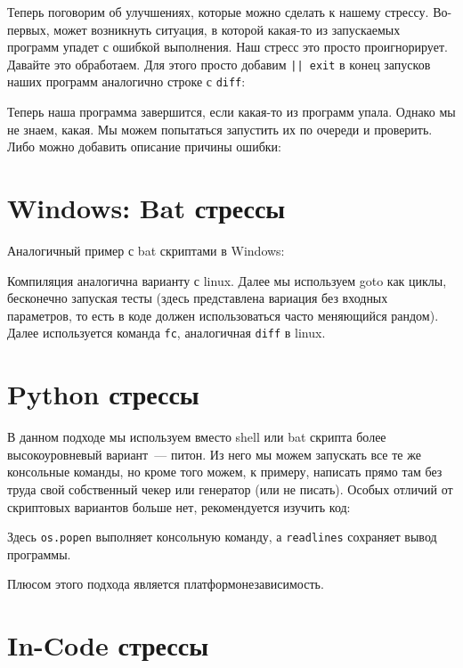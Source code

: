 Теперь поговорим об улучшениях, которые можно сделать к нашему стрессу. Во-первых, может возникнуть ситуация, в которой какая-то из запускаемых программ упадет с ошибкой выполнения. Наш стресс это просто проигнорирует. Давайте это обработаем. Для этого просто добавим \verb+|| exit+ в конец запусков наших программ аналогично строке с \verb+diff+:



Теперь наша программа завершится, если какая-то из программ упала. Однако мы не знаем, какая. Мы можем попытаться запустить их по очереди и проверить. Либо можно добавить описание причины ошибки:



\section{Windows: Bat стрессы}

Аналогичный пример с bat скриптами в Windows:



Компиляция аналогична варианту с linux. Далее мы используем goto как циклы, бесконечно запуская тесты (здесь представлена вариация без входных параметров, то есть в коде должен использоваться часто меняющийся рандом). Далее используется команда \verb+fc+, аналогичная \verb+diff+ в linux.

\section{Python стрессы}

В данном подходе мы используем вместо shell или bat скрипта более высокоуровневый вариант~--- питон. Из него мы можем запускать все те же консольные команды, но кроме того можем, к примеру, написать прямо там без труда свой собственный чекер или генератор (или не писать). Особых отличий от скриптовых вариантов больше нет, рекомендуется изучить код:



Здесь \verb+os.popen+ выполняет консольную команду, а \verb+readlines+ сохраняет вывод программы.

Плюсом этого подхода является платформонезависимость.

\section{In-Code стрессы}

